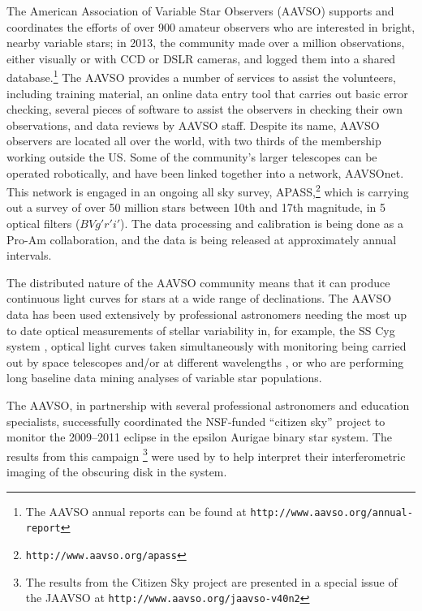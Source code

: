 \documentclass{ar2e}
\def\eg{{\it e.g.}\xspace}
\def\CaseStudy#1{\noindent{\it\bf #1 \,\,\,\,}}
\def\url#1{\texttt{#1}}
\begin{document}
% 
% 

\CaseStudy{Variable Star Monitoring: the AAVSO.}
The American Association of Variable Star Observers (AAVSO) supports and
coordinates the efforts of over 900 amateur observers who are interested in
bright, nearby variable stars; in 2013, the community made over a million
observations, either visually or with CCD or DSLR cameras, and logged them
into a shared database.\footnote{The AAVSO annual reports can be found at
\url{http://www.aavso.org/annual-report}} The AAVSO provides a number of
services to assist the volunteers, including training material, an online data
entry tool that carries out basic error checking, several pieces of
software to assist the observers in checking their own observations, and data
reviews by AAVSO staff. Despite its name, AAVSO observers are located all over
the world, with two thirds of the membership working outside the US. Some of
the community's larger telescopes can be operated robotically, and have been
linked together into a network, AAVSOnet. This network is engaged in an
ongoing all sky survey, APASS,\footnote{\url{http://www.aavso.org/apass}}
which is carrying out a survey of over 50 million stars between 10th and 17th
magnitude, in 5 optical filters ($BVg'r'i'$). The data processing and
calibration is being done as a Pro-Am collaboration, and the data is being
released at approximately annual intervals.

The distributed nature of the AAVSO community means that it can produce
continuous light curves for stars at a wide range of declinations. The AAVSO
data has been used extensively by professional astronomers needing the most 
up to date optical measurements of stellar variability in, for example, the 
SS Cyg system \citep{Miller-Jones++2013},  optical light curves taken
simultaneously with monitoring being carried out by space telescopes and/or at
different wavelengths \citep[see \eg][for a successful joint AAVSO--HST
program]{Szkody++2013},  or who are performing long baseline data mining
analyses of variable star populations. 

The AAVSO, in partnership with several professional astronomers and education
specialists, successfully coordinated the NSF-funded ``citizen sky'' project
to monitor the 2009--2011 eclipse in the epsilon Aurigae binary star system.
The results from this campaign  \citep{Stencel2012}\footnote{The results from
the Citizen Sky project are presented in a special issue of the JAAVSO at 
\url{http://www.aavso.org/jaavso-v40n2}} were used by \citet{Kloppenborg++2010}
to help interpret their interferometric imaging of the obscuring disk in the
system.
\end{document}
